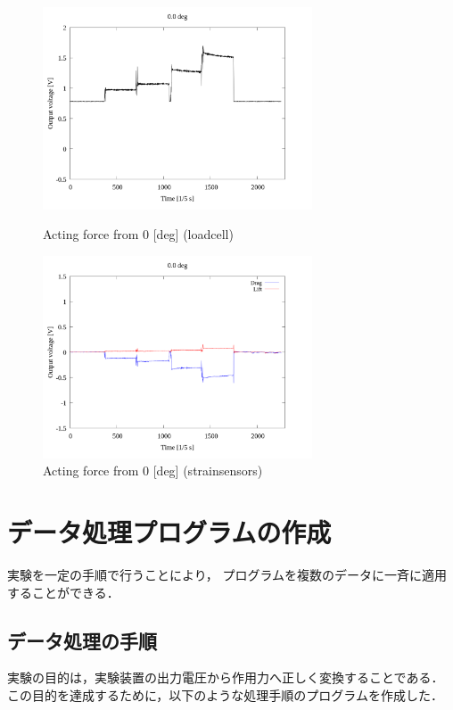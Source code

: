 \documentclass[twocolumn,a4j]{jsarticle}
\begin{document}
\begin{figure}[htbp]
    \footnotesize
    \begin{center}
        \includegraphics[width=80mm]{../images_2/01-1_loadcell/01_loadcell_0.png}
        \caption{Acting force from 0 [deg] (loadcell)}
        \includegraphics[width=80mm]{../images_2/01-2_strainsensors/01_strainsensors_0.png}
        \caption{Acting force from 0 [deg] (strainsensors)}
    \end{center}
\end{figure}

\section{データ処理プログラムの作成}
実験を一定の手順で行うことにより，
プログラムを複数のデータに一斉に適用することができる．\\

\subsection{データ処理の手順}
実験の目的は，実験装置の出力電圧から作用力へ正しく変換することである．
この目的を達成するために，以下のような処理手順のプログラムを作成した．
\end{document}
